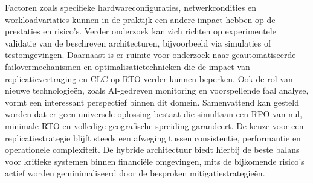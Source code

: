 Factoren zoals specifieke hardwareconfiguraties, netwerkcondities en workloadvariaties kunnen in de praktijk een andere impact hebben op de prestaties en risico's.
Verder onderzoek kan zich richten op experimentele validatie van de beschreven architecturen, bijvoorbeeld via simulaties of testomgevingen. 
Daarnaast is er ruimte voor onderzoek naar geautomatiseerde failovermechanismen en optimalisatietechnieken die de impact van replicatievertraging en CLC op RTO verder kunnen beperken. 
Ook de rol van nieuwe technologieën, zoals AI-gedreven monitoring en voorspellende faal analyse, vormt een interessant perspectief binnen dit domein.
Samenvattend kan gesteld worden dat er geen universele oplossing bestaat die simultaan een RPO van nul, minimale RTO en volledige geografische spreiding garandeert. 
De keuze voor een replicatiestrategie blijft steeds een afweging tussen consistentie, performantie en operationele complexiteit. 
De hybride architectuur biedt hierbij de beste balans voor kritieke systemen binnen financiële omgevingen, mits de bijkomende risico's actief worden geminimaliseerd door de besproken mitigatiestrategieën.
